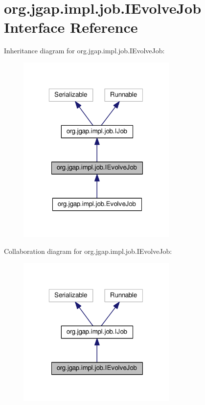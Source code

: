 \hypertarget{interfaceorg_1_1jgap_1_1impl_1_1job_1_1_i_evolve_job}{\section{org.\-jgap.\-impl.\-job.\-I\-Evolve\-Job Interface Reference}
\label{interfaceorg_1_1jgap_1_1impl_1_1job_1_1_i_evolve_job}
}


Inheritance diagram for org.\-jgap.\-impl.\-job.\-I\-Evolve\-Job\-:
\nopagebreak
\begin{figure}[H]
\begin{center}
\leavevmode
\includegraphics[width=223pt]{interfaceorg_1_1jgap_1_1impl_1_1job_1_1_i_evolve_job__inherit__graph}
\end{center}
\end{figure}


Collaboration diagram for org.\-jgap.\-impl.\-job.\-I\-Evolve\-Job\-:
\nopagebreak
\begin{figure}[H]
\begin{center}
\leavevmode
\includegraphics[width=223pt]{interfaceorg_1_1jgap_1_1impl_1_1job_1_1_i_evolve_job__coll__graph}
\end{center}
\end{figure}
